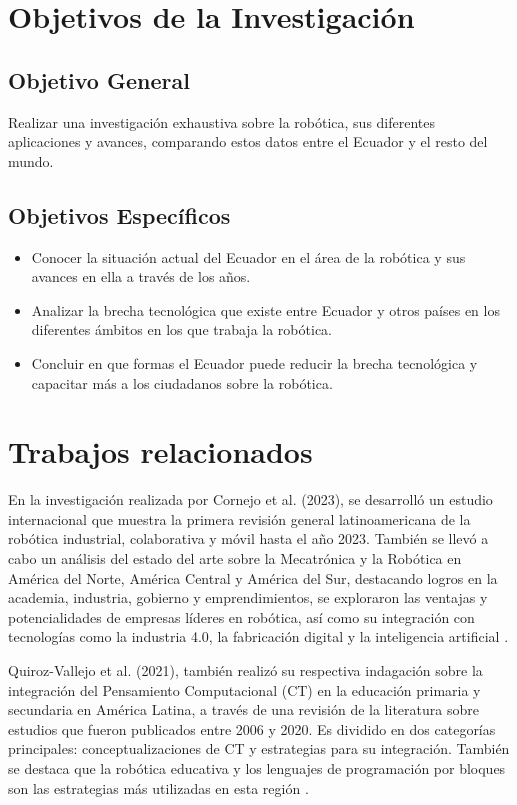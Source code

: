 \documentclass[conference]{IEEEtran}
\begin{document}
\section{Objetivos de la Investigación}

\subsection{Objetivo General}

Realizar una investigación exhaustiva sobre la robótica, sus diferentes aplicaciones y avances, comparando estos datos entre el Ecuador y el resto del mundo.

\subsection{Objetivos Específicos}
\begin{itemize}
\item Conocer la situación actual del Ecuador en el área de la robótica y sus avances en ella a través de los años.
\item Analizar la brecha tecnológica que existe entre Ecuador y otros países en los diferentes ámbitos en los que trabaja la robótica.
\item Concluir en que formas el Ecuador puede reducir la brecha tecnológica y capacitar más a los ciudadanos sobre la robótica.

\end{itemize}

\section{Trabajos relacionados}

En la investigación realizada por Cornejo et al. (2023), se desarrolló un estudio internacional que muestra la primera revisión general latinoamericana de la robótica industrial, colaborativa y móvil hasta el año 2023. También se llevó a cabo un análisis del estado del arte sobre la Mecatrónica y la Robótica en América del Norte, América Central y América del Sur, destacando logros en la academia, industria, gobierno y emprendimientos, se exploraron las ventajas y potencialidades de empresas líderes en robótica, así como su integración con tecnologías como la industria 4.0, la fabricación digital y la inteligencia artificial \cite{Cornejo2023}.

Quiroz-Vallejo et al. (2021), también realizó su respectiva indagación sobre la integración del Pensamiento Computacional (CT) en la educación primaria y secundaria en América Latina, a través de una revisión de la literatura sobre estudios que fueron publicados entre 2006 y 2020. Es dividido en dos categorías principales: conceptualizaciones de CT y estrategias para su integración. También se destaca que la robótica educativa y los lenguajes de programación por bloques son las estrategias más utilizadas en esta región \cite{Quiroz}.
\end{document}
